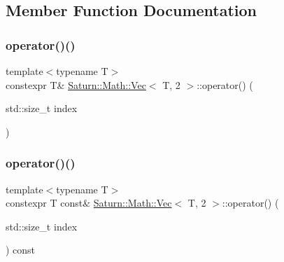 \subsection{Member Function Documentation}
\mbox{\label{class_saturn_1_1_math_1_1_vec_3_01_t_00_012_01_4_a24c12b0fe7dac1cf1a690dbfa57f1e8c}} 
\subsubsection{\texorpdfstring{operator()()}{operator()()}\hspace{0.1cm}{\footnotesize\ttfamily [1/2]}}
{\footnotesize\ttfamily template$<$typename T$>$ \\
constexpr T\& \mbox{\hyperlink{class_saturn_1_1_math_1_1_vec}{Saturn\+::\+Math\+::\+Vec}}$<$ T, 2 $>$\+::operator() (\begin{DoxyParamCaption}\item[{std\+::size\+\_\+t}]{index }\end{DoxyParamCaption})\hspace{0.3cm}{\ttfamily [inline]}}

\mbox{\label{class_saturn_1_1_math_1_1_vec_3_01_t_00_012_01_4_a8d4335b73820fe0bd9510daab0ee8959}} 
\subsubsection{\texorpdfstring{operator()()}{operator()()}\hspace{0.1cm}{\footnotesize\ttfamily [2/2]}}
{\footnotesize\ttfamily template$<$typename T$>$ \\
constexpr T const\& \mbox{\hyperlink{class_saturn_1_1_math_1_1_vec}{Saturn\+::\+Math\+::\+Vec}}$<$ T, 2 $>$\+::operator() (\begin{DoxyParamCaption}\item[{std\+::size\+\_\+t}]{index }\end{DoxyParamCaption}) const\hspace{0.3cm}{\ttfamily [inline]}}

